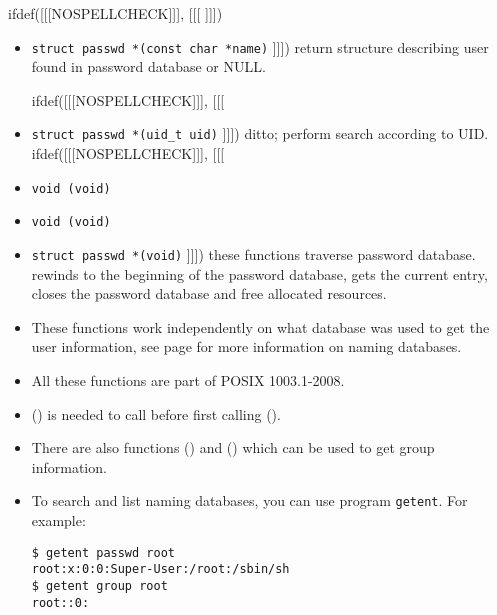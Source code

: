 ifdef([[[NOSPELLCHECK]]], [[[
]]])

\label{GETPW_FUNC}
\begin{slide}
\begin{itemize}
ifdef([[[NOSPELLCHECK]]], [[[
\item \texttt{struct passwd *(const char *name)}
]]])
return structure describing user found in password database or NULL.

ifdef([[[NOSPELLCHECK]]], [[[
\item \texttt{struct passwd *(uid\_t uid)}
]]])
ditto; perform search according to UID.
ifdef([[[NOSPELLCHECK]]], [[[
\item \texttt{void (void)}
\item \texttt{void (void)}
\item \texttt{struct passwd *(void)}
]]])
these functions traverse password database.  rewinds to the
beginning of the password database,  gets the current entry,
 closes the password database and free allocated resources.
\end{itemize}
\end{slide}

\begin{itemize}
\item These functions work independently on what database was used to get the
user information, see page \pageref{name_service_switch} for more information on
naming databases.
\item All these functions are part of POSIX 1003.1-2008.
\item {}() is needed to call before first calling
().
\item There are also functions () and () which
can be used to get group information.
\item To search and list naming databases, you can use program \texttt{getent}.
For example:

\begin{verbatim}
$ getent passwd root
root:x:0:0:Super-User:/root:/sbin/sh
$ getent group root
root::0:
\end{verbatim}
\end{itemize}



